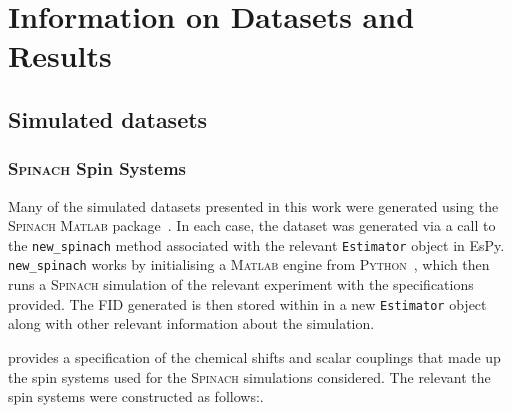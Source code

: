 \chapter{Information on Datasets and Results}
\label{chap:datasets}

\section{Simulated datasets}
\label{sec:simulated-datasets}

\subsection{\textsc{Spinach} Spin Systems}
Many of the simulated datasets presented in this work were generated using the
\textsc{Spinach} \textsc{Matlab} package~\cite{Hogben2011}.
In each case, the dataset was generated via a call to the \texttt{new\_spinach}
method associated with the relevant \texttt{Estimator} object in \ac{EsPy}.
\texttt{new\_spinach} works by initialising a \textsc{Matlab} engine from
\textsc{Python}~\cite{MatlabEngine}, which then runs a \textsc{\textsc{Spinach}}
simulation of the relevant experiment with the specifications provided. The
\ac{FID} generated is then stored within in a new \texttt{Estimator} object
along with other relevant information about the simulation.

 provides a specification of the chemical
shifts and scalar couplings that made up the spin systems used for the
\textsc{Spinach} simulations considered.
The relevant the spin systems were constructed as follows:.
